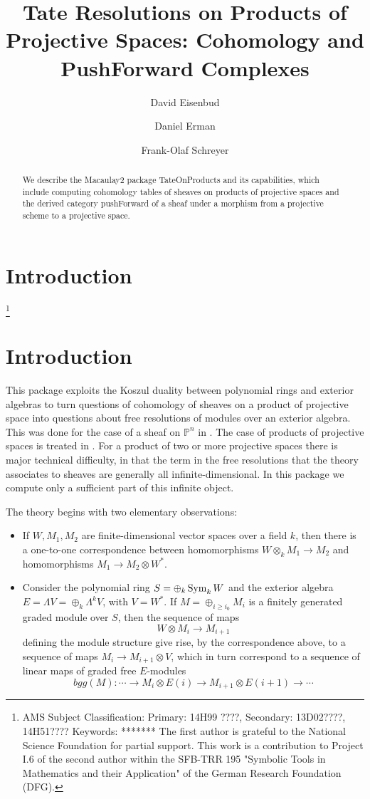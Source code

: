 \documentclass[twoside,12pt, leqno]{amsart}
\author[David Eisenbud]{David Eisenbud}
\author{Daniel Erman}
\author[Frank-Olaf Schreyer]{Frank-Olaf Schreyer}
\title{Tate Resolutions on Products of Projective Spaces: Cohomology and PushForward Complexes}
\def\PP{{\mathbb P}}
\begin{document}
\begin{abstract}
We describe the  Macaulay2 package TateOnProducts and its capabilities, which include computing cohomology tables of sheaves
on products of projective spaces and the derived category pushForward of a sheaf under a morphism from a projective scheme to
a projective space.
\end{abstract}

\maketitle

\section*{Introduction} 
\let\thefootnote\relax\footnote{
\noindent AMS Subject Classification:
Primary: 14H99 ????,
Secondary: 13D02????, 14H51???? \smallbreak
Keywords: *******\smallbreak
The first author is grateful to the
National Science Foundation for partial support. This work is a contribution to Project I.6 of the second author within the SFB-TRR 195 "Symbolic Tools in Mathematics and their Application" of the German Research Foundation (DFG).}


\section*{Introduction}

This package exploits the Koszul duality between polynomial rings and exterior algebras to turn questions of cohomology of sheaves on a product of projective space into questions about free resolutions of modules over an exterior algebra. This was done for the case of a sheaf on $\PP^n$ in
\cite{EFS}. The case of products of projective spaces is treated in \cite{EES}. For a product of two or more projective
spaces there is major technical difficulty, in that the term in the free resolutions that the theory
associates to sheaves are generally all infinite-dimensional. In this package we compute only a sufficient
part of this infinite object.

The theory begins with two elementary observations:
\begin{itemize}
 \item If $W,M_1, M_2$ are finite-dimensional vector spaces over a field $k$, then there is a one-to-one correspondence between homomorphisms $W\otimes_kM_1\to M_2$ and homomorphisms
$ M_1 \to M_2 \otimes W^*$.
\item Consider the polynomial ring $S = \oplus_k \operatorname{Sym}_kW$ and the exterior algebra $E = \Lambda V= \oplus_k \Lambda^kV$, with $V=W^*$.
If $M = \oplus_{i\geq i_0} M_i$ is a finitely generated graded module over $S$, then the sequence of maps 
$$
W\otimes M_i \to M_{i+1}
$$
 defining the module structure give rise, by the correspondence above,
to a sequence of maps $M_i\to M_{i+1}\otimes V$, which in turn correspond to a sequence of
linear maps of graded free $E$-modules 
$$ 
bgg(M): \cdots \to M_i\otimes E(i) \to M_{i+1}\otimes E(i+1)\to \cdots
$$
\end{itemize}
\end{document}
